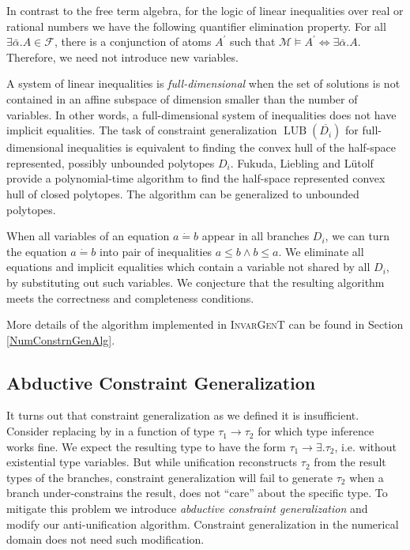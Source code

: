 \documentclass{article}
\newcommand{\tmem}[1]{{\em #1\/}}
\newcommand{\tmname}[1]{\textsc{#1}}
\newcommand{\tmop}[1]{\ensuremath{\operatorname{#1}}}
\newcommand{\tmverbatim}[1]{{\ttfamily{#1}}}
\begin{document}
In contrast to the free term algebra, for the logic of linear inequalities
over real or rational numbers we have the following quantifier elimination
property. For all $\exists \bar{\alpha} .A \in \mathcal{F}$, there is a
conjunction of atoms $A^{\prime}$ such that $\mathcal{M} \vDash A^{\prime}
\Leftrightarrow \exists \bar{\alpha} .A$. Therefore, we need not introduce new
variables.

A system of linear inequalities is {\tmem{full-dimensional}} when the set of
solutions is not contained in an affine subspace of dimension smaller than the
number of variables. In other words, a full-dimensional system of inequalities
does not have implicit equalities. The task of constraint generalization
$\tmop{LUB} (\overline{D_i})$ for full-dimensional inequalities is equivalent
to finding the convex hull of the half-space represented, possibly unbounded
polytopes $D_i$. Fukuda, Liebling and L{\"u}tolf {\cite{ConvexHull}} provide a
polynomial-time algorithm to find the half-space represented convex hull of
closed polytopes. The algorithm can be generalized to unbounded polytopes.

When all variables of an equation $a \dot{=} b$ appear in all branches $D_i$,
we can turn the equation $a \dot{=} b$ into pair of inequalities $a \leqslant
b \wedge b \leqslant a$. We eliminate all equations and implicit equalities
which contain a variable not shared by all $D_i$, by substituting out such
variables. We conjecture that the resulting algorithm meets the correctness
and completeness conditions.

More details of the algorithm implemented in {\tmname{InvarGenT}} can be found
in Section \ref{NumConstrnGenAlg}.

\subsection{Abductive Constraint Generalization}\label{AbdConstrnGenMain}

It turns out that constraint generalization as we defined it is insufficient.
Consider replacing \tmverbatim{function} by \tmverbatim{efunction} in a
function of type $\tau_1 \rightarrow \tau_2$ for which type inference works
fine. We expect the resulting type to have the form $\tau_1 \rightarrow
\exists . \tau_2$, i.e. without existential type variables. But while
unification reconstructs $\tau_2$ from the result types of the branches,
constraint generalization will fail to generate $\tau_2$ when a branch
under-constrains the result, does not ``care'' about the specific type. To
mitigate this problem we introduce {\tmem{abductive constraint
generalization}} and modify our anti-unification algorithm. Constraint
generalization in the numerical domain does not need such modification.
\end{document}
